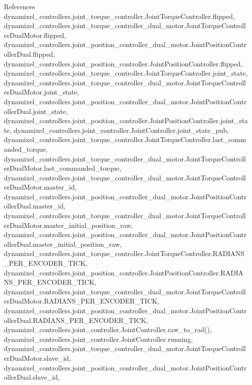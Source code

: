 References dynamixel\+\_\+controllers.\+joint\+\_\+torque\+\_\+controller.\+Joint\+Torque\+Controller.\+flipped, dynamixel\+\_\+controllers.\+joint\+\_\+torque\+\_\+controller\+\_\+dual\+\_\+motor.\+Joint\+Torque\+Controller\+Dual\+Motor.\+flipped, dynamixel\+\_\+controllers.\+joint\+\_\+position\+\_\+controller\+\_\+dual\+\_\+motor.\+Joint\+Position\+Controller\+Dual.\+flipped, dynamixel\+\_\+controllers.\+joint\+\_\+position\+\_\+controller.\+Joint\+Position\+Controller.\+flipped, dynamixel\+\_\+controllers.\+joint\+\_\+torque\+\_\+controller.\+Joint\+Torque\+Controller.\+joint\+\_\+state, dynamixel\+\_\+controllers.\+joint\+\_\+torque\+\_\+controller\+\_\+dual\+\_\+motor.\+Joint\+Torque\+Controller\+Dual\+Motor.\+joint\+\_\+state, dynamixel\+\_\+controllers.\+joint\+\_\+position\+\_\+controller\+\_\+dual\+\_\+motor.\+Joint\+Position\+Controller\+Dual.\+joint\+\_\+state, dynamixel\+\_\+controllers.\+joint\+\_\+position\+\_\+controller.\+Joint\+Position\+Controller.\+joint\+\_\+state, dynamixel\+\_\+controllers.\+joint\+\_\+controller.\+Joint\+Controller.\+joint\+\_\+state\+\_\+pub, dynamixel\+\_\+controllers.\+joint\+\_\+torque\+\_\+controller.\+Joint\+Torque\+Controller.\+last\+\_\+commanded\+\_\+torque, dynamixel\+\_\+controllers.\+joint\+\_\+torque\+\_\+controller\+\_\+dual\+\_\+motor.\+Joint\+Torque\+Controller\+Dual\+Motor.\+last\+\_\+commanded\+\_\+torque, dynamixel\+\_\+controllers.\+joint\+\_\+torque\+\_\+controller\+\_\+dual\+\_\+motor.\+Joint\+Torque\+Controller\+Dual\+Motor.\+master\+\_\+id, dynamixel\+\_\+controllers.\+joint\+\_\+position\+\_\+controller\+\_\+dual\+\_\+motor.\+Joint\+Position\+Controller\+Dual.\+master\+\_\+id, dynamixel\+\_\+controllers.\+joint\+\_\+torque\+\_\+controller\+\_\+dual\+\_\+motor.\+Joint\+Torque\+Controller\+Dual\+Motor.\+master\+\_\+initial\+\_\+position\+\_\+raw, dynamixel\+\_\+controllers.\+joint\+\_\+position\+\_\+controller\+\_\+dual\+\_\+motor.\+Joint\+Position\+Controller\+Dual.\+master\+\_\+initial\+\_\+position\+\_\+raw, dynamixel\+\_\+controllers.\+joint\+\_\+torque\+\_\+controller.\+Joint\+Torque\+Controller.\+R\+A\+D\+I\+A\+N\+S\+\_\+\+P\+E\+R\+\_\+\+E\+N\+C\+O\+D\+E\+R\+\_\+\+T\+I\+CK, dynamixel\+\_\+controllers.\+joint\+\_\+position\+\_\+controller.\+Joint\+Position\+Controller.\+R\+A\+D\+I\+A\+N\+S\+\_\+\+P\+E\+R\+\_\+\+E\+N\+C\+O\+D\+E\+R\+\_\+\+T\+I\+CK, dynamixel\+\_\+controllers.\+joint\+\_\+torque\+\_\+controller\+\_\+dual\+\_\+motor.\+Joint\+Torque\+Controller\+Dual\+Motor.\+R\+A\+D\+I\+A\+N\+S\+\_\+\+P\+E\+R\+\_\+\+E\+N\+C\+O\+D\+E\+R\+\_\+\+T\+I\+CK, dynamixel\+\_\+controllers.\+joint\+\_\+position\+\_\+controller\+\_\+dual\+\_\+motor.\+Joint\+Position\+Controller\+Dual.\+R\+A\+D\+I\+A\+N\+S\+\_\+\+P\+E\+R\+\_\+\+E\+N\+C\+O\+D\+E\+R\+\_\+\+T\+I\+CK, dynamixel\+\_\+controllers.\+joint\+\_\+controller.\+Joint\+Controller.\+raw\+\_\+to\+\_\+rad(), dynamixel\+\_\+controllers.\+joint\+\_\+controller.\+Joint\+Controller.\+running, dynamixel\+\_\+controllers.\+joint\+\_\+torque\+\_\+controller\+\_\+dual\+\_\+motor.\+Joint\+Torque\+Controller\+Dual\+Motor.\+slave\+\_\+id, dynamixel\+\_\+controllers.\+joint\+\_\+position\+\_\+controller\+\_\+dual\+\_\+motor.\+Joint\+Position\+Controller\+Dual.\+slave\+\_\+id, 